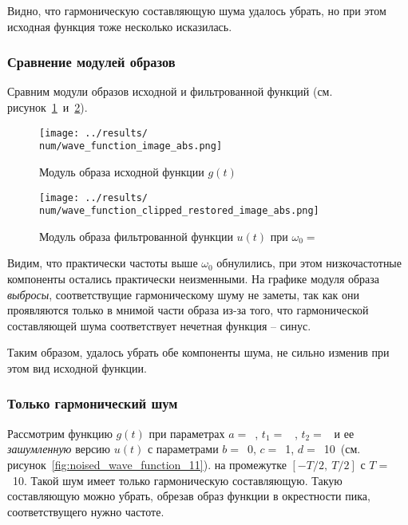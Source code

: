 Видно, что гармоническую составляющую шума удалось убрать, но при этом исходная функция тоже несколько исказилась. 

\FloatBarrier
\subsubsection{Сравнение модулей образов}
Сравним модули образов исходной и фильтрованной функций (см. рисунок~\ref{fig:wave_function_image_abs_\num}~и~\ref{fig:wave_function_clipped_restored_image_abs_\num}).

\begin{figure}[ht!]
    \centering
    \texttt{[image: ../results/\\num/wave\_function\_image\_abs.png]}
    \caption{Модуль образа исходной функции $g(t)$}
    \label{fig:wave_function_image_abs_\num}
\end{figure}

\begin{figure}[ht!]
    \centering
    \texttt{[image: ../results/\\num/wave\_function\_clipped\_restored\_image\_abs.png]}
    \caption{Модуль образа фильтрованной функции $u(t)$ при $\omega_0=$~\imageclip}
    \label{fig:wave_function_clipped_restored_image_abs_\num}
\end{figure}

Видим, что практически частоты выше $\omega_0$ обнулились, при этом низкочастотные компоненты остались практически неизменными. 
На графике модуля образа \textit{выбросы}, соответствущие гармоническому шуму не заметы, так как они проявляются только в 
мнимой части образа из-за того, что гармонической составляющей шума соответствует нечетная функция -- синус. 

\FloatBarrier
Таким образом, удалось убрать обе компоненты шума, не сильно изменив при этом вид исходной функции. 

\FloatBarrier
\subsubsection{Только гармонический шум}

\def\num{11}
\def\b{0}
\def\c{1}
\def\d{10}
\def\T{10}

Рассмотрим функцию $g(t)$ при параметрах $a=$~\a, $t_1 =$~ \from, $t_2 =$~\to 
и ее \textit{зашумленную} версию $u(t)$ с параметрами $b =$~\b, $c =$~\c, $d =$~\d ~(см. рисунок~\ref{fig:noised_wave_function_\num}).
на промежутке $[-T/2,~T/2]$ с $T =$~\T.
Такой шум имеет только гармоническую составляющую. Такую составляющую можно убрать, обрезав образ функции в окрестности пика, соответствущего нужно частоте. 

